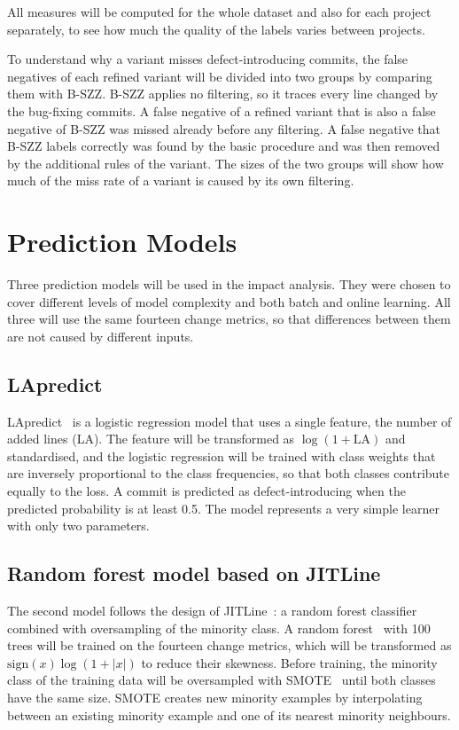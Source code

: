 \documentclass[12pt,a4paper,oneside]{report}
\begin{document}
All measures will be computed for the whole dataset and also for each project
separately, to see how much the quality of the labels varies between
projects.

To understand why a variant misses defect-introducing commits, the false
negatives of each refined variant will be divided into two groups by
comparing them with B-SZZ. B-SZZ applies no filtering, so it traces every
line changed by the bug-fixing commits. A false negative of a refined variant
that is also a false negative of B-SZZ was missed already before any
filtering. A false negative that B-SZZ labels correctly was found by the
basic procedure and was then removed by the additional rules of the variant.
The sizes of the two groups will show how much of the miss rate of a variant
is caused by its own filtering.

\section{Prediction Models}\label{sec:models}

Three prediction models will be used in the impact analysis. They were chosen
to cover different levels of model complexity and both batch and online
learning. All three will use the same fourteen change metrics, so that
differences between them are not caused by different inputs.

\subsection{LApredict}

LApredict~\cite{zeng2021lapredict} is a logistic regression model that uses a
single feature, the number of added lines (LA). The feature will be
transformed as $\log(1+\mathrm{LA})$ and standardised, and the logistic
regression will be trained with class weights that are inversely proportional
to the class frequencies, so that both classes contribute equally to the
loss. A commit is predicted as defect-introducing when the predicted
probability is at least 0.5. The model represents a very simple learner with
only two parameters.

\subsection{Random forest model based on JITLine}

The second model follows the design of
JITLine~\cite{pornprasit2021jitline}: a random forest classifier combined
with oversampling of the minority class. A random
forest~\cite{breiman2001rf} with 100 trees will be trained on the fourteen
change metrics, which will be transformed as $\mathrm{sign}(x)\log(1+|x|)$ to
reduce their skewness. Before training, the minority class of the training
data will be oversampled with SMOTE~\cite{chawla2002smote} until both classes
have the same size. SMOTE creates new minority examples by interpolating
between an existing minority example and one of its nearest minority
neighbours.
\end{document}
